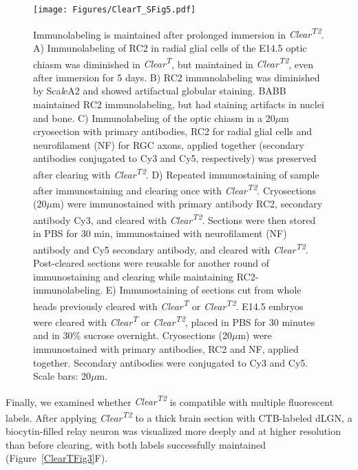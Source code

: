 \begin{figure}[hbtp]
    \begin{center}
        \texttt{[image: Figures/ClearT\_SFig5.pdf]}
        \caption[Immunolabeling is maintained after prolonged immersion in \emph{Clear\textsuperscript{T2}}.]
        {Immunolabeling is maintained after prolonged immersion in \emph{Clear\textsuperscript{T2}}.
        A) Immunolabeling of RC2 in radial glial cells of the E14.5 optic chiasm was diminished in \emph{Clear\textsuperscript{T}}, but maintained in \emph{Clear\textsuperscript{T2}}, even after immersion for 5 days.
        B) RC2 immunolabeling was diminished by Sca\emph{l}eA2 and showed artifactual globular staining.
        BABB maintained RC2 immunolabeling, but had staining artifacts in nuclei and bone.
        C) Immunolabeling of the optic chiasm in a 20$\mu$m cryosection with primary antibodies, RC2 for radial glial cells
and neurofilament (NF) for RGC axons, applied together (secondary antibodies conjugated to Cy3 and Cy5, respectively) was
preserved after clearing with \emph{Clear\textsuperscript{T2}}.
        D) Repeated immunostaining of sample after immunostaining and clearing once with \emph{Clear\textsuperscript{T2}}.
        Cryosections (20$\mu$m) were immunostained with primary antibody RC2, secondary antibody Cy3, and cleared with \emph{Clear\textsuperscript{T2}}.
        Sections were then stored in PBS for 30 min, immunostained with neurofilament (NF) antibody and Cy5 secondary antibody, and cleared with \emph{Clear\textsuperscript{T2}}.
        Post-cleared sections were reusable for another round of immunostaining and clearing while maintaining RC2-immunolabeling.
        E) Immunostaining of sections cut from whole heads previously cleared with \emph{Clear\textsuperscript{T}} or \emph{Clear\textsuperscript{T2}}.
        E14.5 embryos were cleared with \emph{Clear\textsuperscript{T}} or \emph{Clear\textsuperscript{T2}}, placed in PBS for 30 minutes and in 30\% sucrose overnight.
        Cryosections (20$\mu$m) were immunostained with primary antibodies, RC2 and NF, applied together.
        Secondary antibodies were conjugated to Cy3 and Cy5.
        Scale bars: 20$\mu$m.
        }
        \label{ClearTSFig5}
    \end{center}
\end{figure}

Finally, we examined whether \emph{Clear\textsuperscript{T2}} is compatible with multiple fluorescent labels.
After applying \emph{Clear\textsuperscript{T2}} to a thick brain section with CTB-labeled dLGN, a biocytin-filled relay neuron was visualized more deeply and at higher resolution than before clearing, with both labels successfully maintained (Figure~\ref{ClearTFig3}F).
